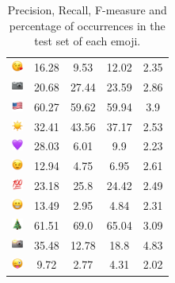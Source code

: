 \documentclass{article}
\begin{document}
\begin{table}
\begin{tabular}{|c|ccc|c|}
\includegraphics[height=0.37cm,width=0.37cm]{img/face_blowing_a_kiss.png} & 16.28 & 9.53 & 12.02 & 2.35\\ 
\includegraphics[height=0.37cm,width=0.37cm]{img/camera.png} & 20.68 & 27.44 & 23.59 & 2.86\\ 
\includegraphics[height=0.37cm,width=0.37cm]{img/United_States.png} & 60.27 & 59.62 & 59.94 & 3.9\\ 
\includegraphics[height=0.37cm,width=0.37cm]{img/sun.png} & 32.41 & 43.56 & 37.17 & 2.53\\ 
\includegraphics[height=0.37cm,width=0.37cm]{img/purple_heart.png} & 28.03 & 6.01 & 9.9 & 2.23\\ 
\includegraphics[height=0.37cm,width=0.37cm]{img/winking_face.png} & 12.94 & 4.75 & 6.95 & 2.61\\ 
\includegraphics[height=0.37cm,width=0.37cm]{img/hundred_points.png} & 23.18 & 25.8 & 24.42 & 2.49\\ 
\includegraphics[height=0.37cm,width=0.37cm]{img/beaming_face_with_smiling_eyes.png} & 13.49 & 2.95 & 4.84 & 2.31\\ 
\includegraphics[height=0.37cm,width=0.37cm]{img/Christmas_tree.png} & 61.51 & 69.0 & 65.04 & 3.09\\ 
\includegraphics[height=0.37cm,width=0.37cm]{img/camera_with_flash.png} & 35.48 & 12.78 & 18.8 & 4.83\\ 
\includegraphics[height=0.37cm,width=0.37cm]{img/winking_face_with_tongue.png} & 9.72 & 2.77 & 4.31 & 2.02\\ 

\hline
\end{tabular}
\caption{\label{table:emoji_detailed} Precision, Recall, F-measure and percentage of occurrences in the test set of each emoji.}
\end{table}
\end{document}
